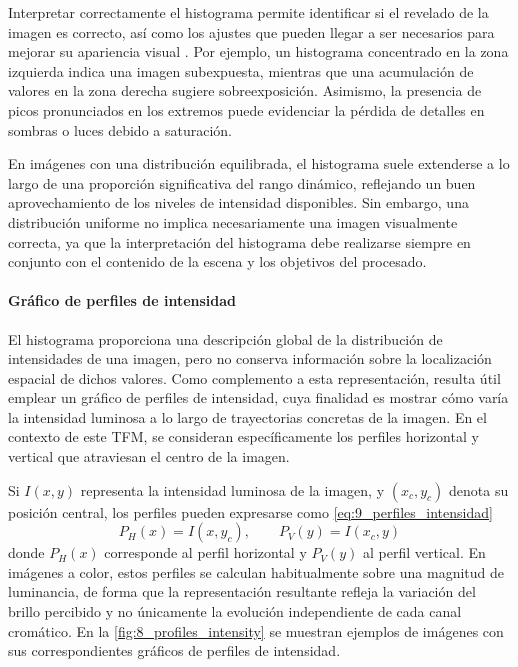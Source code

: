 Interpretar correctamente el histograma permite identificar si el revelado de la imagen es correcto, 
así como los ajustes que pueden llegar a ser necesarios para mejorar su apariencia visual \cite{camera_histogram}.
Por ejemplo, un histograma concentrado en la zona izquierda indica una imagen subexpuesta, mientras
que una acumulación de valores en la zona derecha sugiere sobreexposición. Asimismo, la presencia de
picos pronunciados en los extremos puede evidenciar la pérdida de detalles en sombras o luces debido a 
saturación.

En imágenes con una distribución equilibrada, el histograma suele extenderse a lo largo de una proporción
significativa del rango dinámico, reflejando un buen aprovechamiento de los niveles de intensidad disponibles.
Sin embargo, una distribución uniforme no implica necesariamente una
imagen visualmente correcta, ya que la interpretación del histograma debe realizarse siempre en
conjunto con el contenido de la escena y los objetivos del procesado.

\newpage

\paragraph{Gráfico de perfiles de intensidad} \label{subsubsubsec:3_5_2_2_grafico_perfiles_intensidad}
El histograma proporciona una descripción global de la distribución de intensidades de una imagen, pero no conserva 
información sobre la localización espacial de dichos valores. Como complemento a esta representación, resulta útil 
emplear un gráfico de perfiles de intensidad, cuya finalidad es mostrar cómo varía la intensidad luminosa a lo largo 
de trayectorias concretas de la imagen. En el contexto de este TFM, se consideran específicamente los perfiles 
horizontal y vertical que atraviesan el centro de la imagen.

Si $I(x,y)$ representa la intensidad luminosa de la imagen, y $(x_c, y_c)$ denota su posición central, los perfiles pueden expresarse como \eqref{eq:9_perfiles_intensidad}
\begin{equation}
    P_H(x) = I(x, y_c), \qquad P_V(y) = I(x_c, y)
    \label{eq:9_perfiles_intensidad}
\end{equation}
donde $P_H(x)$ corresponde al perfil horizontal y $P_V(y)$ al perfil vertical. En imágenes a color, estos perfiles se calculan habitualmente 
sobre una magnitud de luminancia, de forma que la representación resultante refleja la variación del brillo percibido y no únicamente 
la evolución independiente de cada canal cromático. En la \autoref{fig:8_profiles_intensity} se muestran ejemplos de imágenes 
con sus correspondientes gráficos de perfiles de intensidad.

